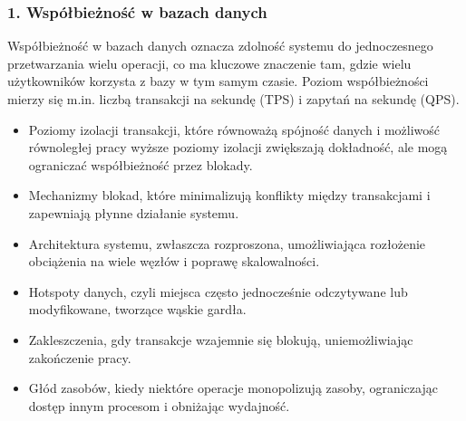 \documentclass[letterpaper,10pt,polish]{sphinxmanual}
\begin{document}
\subsubsection{1. Współbieżność w bazach danych}
\label{\detokenize{rozdzial2/Wydajnosc_Skalowanie_i_Replikacja/index:wspolbieznosc-w-bazach-danych}}
\sphinxAtStartPar
Współbieżność w bazach danych oznacza zdolność systemu do jednoczesnego przetwarzania wielu operacji, co ma kluczowe znaczenie tam, gdzie wielu użytkowników korzysta z bazy w tym samym czasie. Poziom współbieżności mierzy się m.in. liczbą transakcji na sekundę (TPS) i zapytań na sekundę (QPS).
\begin{description}
\begin{itemize}
\item {} 
\sphinxAtStartPar
Poziomy izolacji transakcji, które równoważą spójność danych i możliwość równoległej pracy \textendash{} wyższe poziomy izolacji zwiększają dokładność, ale mogą ograniczać współbieżność przez blokady.

\item {} 
\sphinxAtStartPar
Mechanizmy blokad, które minimalizują konflikty między transakcjami i zapewniają płynne działanie systemu.

\item {} 
\sphinxAtStartPar
Architektura systemu, zwłaszcza rozproszona, umożliwiająca rozłożenie obciążenia na wiele węzłów i poprawę skalowalności.

\end{itemize}

\begin{itemize}
\item {} 
\sphinxAtStartPar
Hotspoty danych, czyli miejsca często jednocześnie odczytywane lub modyfikowane, tworzące wąskie gardła.

\item {} 
\sphinxAtStartPar
Zakleszczenia, gdy transakcje wzajemnie się blokują, uniemożliwiając zakończenie pracy.

\item {} 
\sphinxAtStartPar
Głód zasobów, kiedy niektóre operacje monopolizują zasoby, ograniczając dostęp innym procesom i obniżając wydajność.

\end{itemize}

\end{description}
\end{document}
